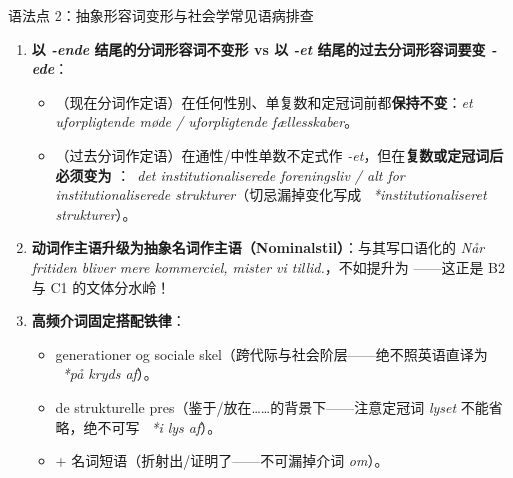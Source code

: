 \begin{grammatikbox}{语法点 2：抽象形容词变形与社会学常见语病排查}
\begin{enumerate}
  \item \textbf{以 \textit{-ende} 结尾的分词形容词不变形 vs 以 \textit{-et} 结尾的过去分词形容词要变 \textit{-ede}}：
    \begin{itemize}
      \item {}（现在分词作定语）在任何性别、单复数和定冠词前都\textbf{保持不变}：\textit{et uforpligtende møde / uforpligtende fællesskaber}。
      \item {}（过去分词作定语）在通性/中性单数不定式作 \textit{-et}，但在\textbf{复数或定冠词后必须变为 }：\ \textit{det institutionaliserede foreningsliv / alt for institutionaliserede strukturer}（切忌漏掉变化写成 \ \textit{*institutionaliseret strukturer}）。
    \end{itemize}
  \item \textbf{动词作主语升级为抽象名词作主语（Nominalstil）}：与其写口语化的 \textit{Når fritiden bliver mere kommerciel, mister vi tillid.}，不如提升为 ——这正是 B2 与 C1 的文体分水岭！
  \item \textbf{高频介词固定搭配铁律}：
    \begin{itemize}
      \item {} generationer og sociale skel（跨代际与社会阶层——绝不照英语直译为 \ \textit{*på kryds af}）。
      \item {} de strukturelle pres（鉴于/放在……的背景下——注意定冠词 \textit{lyset} 不能省略，绝不可写 \ \textit{*i lys af}）。
      \item {} + 名词短语（折射出/证明了——不可漏掉介词 \textit{om}）。
    \end{itemize}
\end{enumerate}
\end{grammatikbox}



